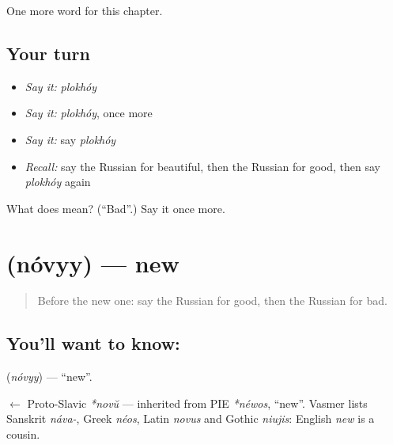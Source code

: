 \begin{grammarlens}[title={What you've built}]
One more word for this chapter.
\end{grammarlens}

\subsection*{Your turn}
\begin{itemize}
\raggedright
  \item \emph{Say it:} \emph{plokhóy}
  \item \emph{Say it:} \emph{plokhóy}, once more
  \item \emph{Say it:} say \emph{plokhóy}
  \item \emph{Recall:} say the Russian for beautiful, then the Russian for good, then say \emph{plokhóy} again
\end{itemize}

\begin{tcolorbox}[breakable,colback=teal!4,colframe=teal!35!black,title={Before you move on}]
What does  mean? (\textquotedblleft{}Bad\textquotedblright{}.) Say it once more.
\end{tcolorbox}
\section[\texorpdfstring{\ru{новый} (nóvyy)}{новый (nóvyy)}]{ (nóvyy) — new}

\label{lesson:RU-C64-new}



\begin{quote}
Before the new one: say the Russian for good, then the Russian for bad.
\end{quote}

\subsection*{You'll want to know: }
\textbf{} (\emph{nóvyy}) — \textquotedblleft{}new\textquotedblright{}.

\begin{cousinweb}
\textbf{} $\leftarrow$ Proto-Slavic \emph{*novŭ} — inherited from PIE \emph{*néwos}, \textquotedblleft{}new\textquotedblright{}. Vasmer lists Sanskrit \emph{náva-}, Greek \emph{néos}, Latin \emph{novus} and Gothic \emph{niujis}: English \emph{new} is a cousin.
\end{cousinweb}

